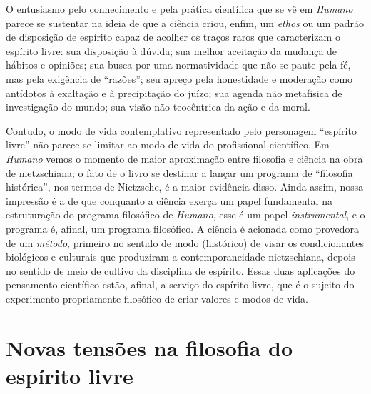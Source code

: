 \documentclass[
	12pt,				%
	openright,			%
	oneside,			%
	a4paper,			%
	english,			%
	french,				%
	spanish,			%
	brazil				%
	]{abntex2}
\begin{document}
	O entusiasmo pelo conhecimento e pela prática científica que se vê em \textit{Humano} parece se sustentar na ideia de que a ciência criou, enfim, um \textit{ethos} ou um padrão de disposição de espírito capaz de acolher os traços raros que caracterizam o espírito livre: sua disposição à dúvida; sua melhor aceitação da mudança de hábitos e opiniões; sua busca por uma normatividade que não se paute pela fé, mas pela exigência de “razões”; seu apreço pela honestidade e moderação como antídotos à exaltação e à precipitação do juízo; sua agenda não metafísica de investigação do mundo; sua visão não teocêntrica da ação e da moral.

Contudo, o modo de vida contemplativo representado pelo personagem “espírito livre” não parece se limitar ao modo de vida do profissional científico. Em \textit{Humano} vemos o momento de maior aproximação entre filosofia e ciência na obra de nietzschiana; o fato de o livro se destinar a lançar um programa de “filosofia histórica”, nos termos de Nietzsche, é a maior evidência disso. Ainda assim, nossa impressão é a de que conquanto a ciência exerça um papel fundamental na estruturação do programa filosófico de \textit{Humano}, esse é um papel \textit{instrumental}, e o programa é, afinal, um programa filosófico. A ciência é acionada como provedora de um \textit{método}, primeiro no sentido de modo (histórico) de visar os condicionantes biológicos e culturais que produziram a contemporaneidade nietzschiana, depois no sentido de meio de cultivo da disciplina de espírito. Essas duas aplicações do pensamento científico estão, afinal, a serviço do espírito livre, que é o sujeito do experimento propriamente filosófico de criar valores e modos de vida.

\chapter{Novas tensões na filosofia do espírito livre}
\label{cap2}
\end{document}
